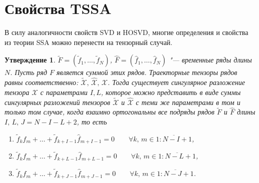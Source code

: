 \documentclass[specialist,
    substylefile = spbu_report.rtx,
    subf,href,colorlinks=true, 12pt]{disser}
\theoremstyle{plain}
\newtheorem{statement}{Утверждение}[section]
\theoremstyle{definition}
\theoremstyle{remark}
\begin{document}
    \section{Свойства TSSA}\label{sec:tssa-properties}
    В силу аналогичности свойств SVD и HOSVD, многие определения и свойства из теории SSA можно перенести на тензорный случай.
    \begin{statement}
        \label{state:separability}
        $\tilde{F}=(\tilde{f}_1,\ldots , \tilde{f}_N)$, $\hat{F}=(\hat{f}_1,\ldots , \hat{f}_N)$ "--- временные ряды длины $N$.
        Пусть ряд $F$ является суммой этих рядов.
        Траекторные тензоры рядов равны соответственно: $\tilde{\mathcal{X}},\, \hat{\mathcal{X}},\, \mathcal{X}$.
        Тогда существует сингулярное разложение тензора $\mathcal{X}$ с параметрами $I, L$, которое можно представить
        в виде суммы сингулярных разложений тензоров $\tilde{\mathcal{X}}$ и $\hat{\mathcal{X}}$ с теми же параметрами
        в том и только том случае, когда взаимно ортогональны все подряды рядов $\tilde{F}$ и $\hat{F}$
        длины $I,\, L,\, J=N-I-L+2$, то есть
        \begin{enumerate}
            \item $\tilde{f}_{k}\hat{f}_m + \ldots + \tilde{f}_{k+I-1} \hat{f}_{m+I-1}=0 \qquad \forall k,\, m\in\overline{1:N-I+1}$,
            \item $\tilde{f}_{k}\hat{f}_m + \ldots + \tilde{f}_{k+L-1} \hat{f}_{m+L-1}=0 \qquad \forall k,\, m\in\overline{1:N-L+1}$,
            \item $\tilde{f}_{k}\hat{f}_m + \ldots + \tilde{f}_{k+J-1} \hat{f}_{m+J-1}=0 \qquad \forall k,\, m\in\overline{1:N-J+1}$.
        \end{enumerate}
    \end{statement}
\end{document}
